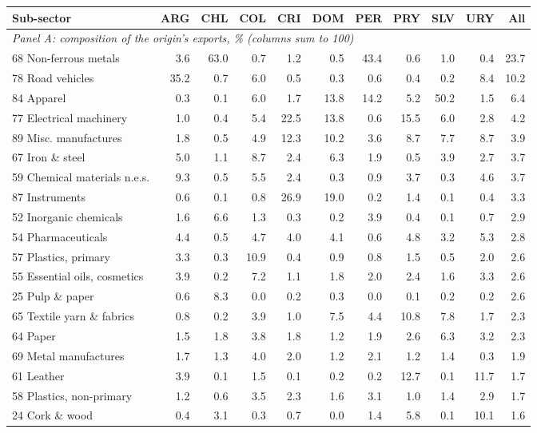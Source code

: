 \begin{tabular}{lrrrrrrrrrr}
\toprule
Sub-sector & ARG & CHL & COL & CRI & DOM & PER & PRY & SLV & URY & All \\
\midrule
\multicolumn{11}{l}{\textit{Panel A: composition of the origin's exports, \% (columns sum to 100)}} \\
68 Non-ferrous metals & 3.6 & 63.0 & 0.7 & 1.2 & 0.5 & 43.4 & 0.6 & 1.0 & 0.4 & 23.7 \\
78 Road vehicles & 35.2 & 0.7 & 6.0 & 0.5 & 0.3 & 0.6 & 0.4 & 0.2 & 8.4 & 10.2 \\
84 Apparel & 0.3 & 0.1 & 6.0 & 1.7 & 13.8 & 14.2 & 5.2 & 50.2 & 1.5 & 6.4 \\
77 Electrical machinery & 1.0 & 0.4 & 5.4 & 22.5 & 13.8 & 0.6 & 15.5 & 6.0 & 2.8 & 4.2 \\
89 Misc. manufactures & 1.8 & 0.5 & 4.9 & 12.3 & 10.2 & 3.6 & 8.7 & 7.7 & 8.7 & 3.9 \\
67 Iron \& steel & 5.0 & 1.1 & 8.7 & 2.4 & 6.3 & 1.9 & 0.5 & 3.9 & 2.7 & 3.7 \\
59 Chemical materials n.e.s. & 9.3 & 0.5 & 5.5 & 2.4 & 0.3 & 0.9 & 3.7 & 0.3 & 4.6 & 3.7 \\
87 Instruments & 0.6 & 0.1 & 0.8 & 26.9 & 19.0 & 0.2 & 1.4 & 0.1 & 0.4 & 3.3 \\
52 Inorganic chemicals & 1.6 & 6.6 & 1.3 & 0.3 & 0.2 & 3.9 & 0.4 & 0.1 & 0.7 & 2.9 \\
54 Pharmaceuticals & 4.4 & 0.5 & 4.7 & 4.0 & 4.1 & 0.6 & 4.8 & 3.2 & 5.3 & 2.8 \\
57 Plastics, primary & 3.3 & 0.3 & 10.9 & 0.4 & 0.9 & 0.8 & 1.5 & 0.5 & 2.0 & 2.6 \\
55 Essential oils, cosmetics & 3.9 & 0.2 & 7.2 & 1.1 & 1.8 & 2.0 & 2.4 & 1.6 & 3.3 & 2.6 \\
25 Pulp \& paper & 0.6 & 8.3 & 0.0 & 0.2 & 0.3 & 0.0 & 0.1 & 0.2 & 0.2 & 2.6 \\
65 Textile yarn \& fabrics & 0.8 & 0.2 & 3.9 & 1.0 & 7.5 & 4.4 & 10.8 & 7.8 & 1.7 & 2.3 \\
64 Paper & 1.5 & 1.8 & 3.8 & 1.8 & 1.2 & 1.9 & 2.6 & 6.3 & 3.2 & 2.3 \\
69 Metal manufactures & 1.7 & 1.3 & 4.0 & 2.0 & 1.2 & 2.1 & 1.2 & 1.4 & 0.3 & 1.9 \\
61 Leather & 3.9 & 0.1 & 1.5 & 0.1 & 0.2 & 0.2 & 12.7 & 0.1 & 11.7 & 1.7 \\
58 Plastics, non-primary & 1.2 & 0.6 & 3.5 & 2.3 & 1.6 & 3.1 & 1.0 & 1.4 & 2.9 & 1.7 \\
24 Cork \& wood & 0.4 & 3.1 & 0.3 & 0.7 & 0.0 & 1.4 & 5.8 & 0.1 & 10.1 & 1.6 \\

\end{tabular}
